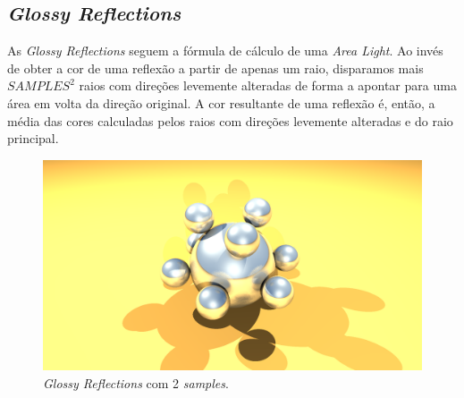 \documentclass{article}
\begin{document}
        \subsection*{\textit{Glossy Reflections}}  
            \par
	As \textit{Glossy Reflections} seguem a fórmula de cálculo de uma \textit{Area Light}. Ao invés de obter a cor de uma reflexão a partir de apenas um raio, disparamos mais ${SAMPLES}^2$ raios com direções levemente alteradas de forma a apontar para uma área em volta da direção original. A cor resultante de uma reflexão é, então, a média das cores calculadas pelos raios com direções levemente alteradas e do raio principal.
            \begin{figure}[h!]
                \centering
                \includegraphics[scale=0.122]{glrefl}
                \caption{\textit{Glossy Reflections} com 2 \textit{samples}.}
            \end{figure}
\end{document}

